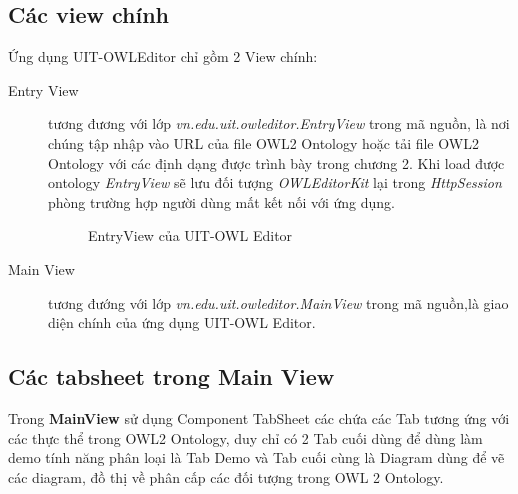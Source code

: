 \subsection{Các view chính}
Ứng dụng UIT-OWLEditor chỉ gồm 2 View chính: 
\begin{description}
\item[Entry View] tương đương với lớp \textit{vn.edu.uit.owleditor.EntryView} trong mã nguồn, là nơi chúng tập nhập vào URL của file OWL2 Ontology hoặc tải file OWL2 Ontology với các định dạng được trình bày trong chương 2. Khi load được ontology \textit{EntryView} sẽ lưu đối tượng \textit{OWLEditorKit} lại trong \textit{HttpSession} phòng trường hợp người dùng mất kết nối với ứng dụng.
\begin{figure}[h!]
	\centering
	\caption{EntryView của UIT-OWL Editor\label{overflow}}
\end{figure}
\item[Main View] tương đướng với lớp \textit{vn.edu.uit.owleditor.MainView} trong mã nguồn,là giao diện chính của ứng dụng UIT-OWL Editor.
\end{description}
%
\subsection{Các tabsheet trong Main View}
Trong \textbf{MainView} sử dụng Component TabSheet các chứa các Tab tương ứng với các thực thể trong OWL2 Ontology, duy chỉ có 2 Tab cuối dùng để dùng làm demo tính năng phân loại là Tab Demo và Tab cuối cùng là Diagram dùng để vẽ các diagram, đồ thị về phân cấp các đối tượng trong OWL 2 Ontology.

